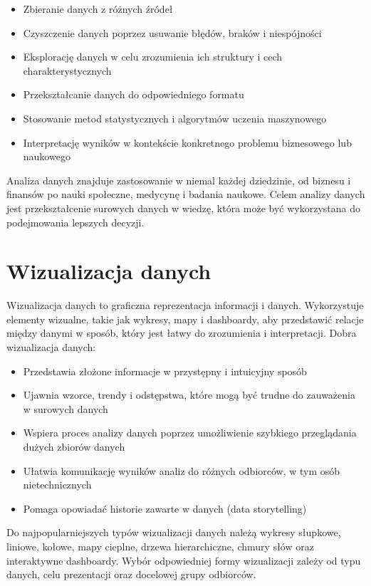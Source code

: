\documentclass[
  letterpaper,
  DIV=11,
  numbers=noendperiod]{scrreprt}
\providecommand{\tightlist}{%
  \setlength{\itemsep}{0pt}\setlength{\parskip}{0pt}}\usepackage{longtable,booktabs,array}
\begin{document}
\begin{itemize}
\tightlist
\item
  Zbieranie danych z różnych źródeł
\item
  Czyszczenie danych poprzez usuwanie błędów, braków i niespójności
\item
  Eksplorację danych w celu zrozumienia ich struktury i cech
  charakterystycznych
\item
  Przekształcanie danych do odpowiedniego formatu
\item
  Stosowanie metod statystycznych i algorytmów uczenia maszynowego
\item
  Interpretację wyników w kontekście konkretnego problemu biznesowego
  lub naukowego
\end{itemize}

Analiza danych znajduje zastosowanie w niemal każdej dziedzinie, od
biznesu i finansów po nauki społeczne, medycynę i badania naukowe. Celem
analizy danych jest przekształcenie surowych danych w wiedzę, która może
być wykorzystana do podejmowania lepszych decyzji.

\section{Wizualizacja danych}\label{wizualizacja-danych}

Wizualizacja danych to graficzna reprezentacja informacji i danych.
Wykorzystuje elementy wizualne, takie jak wykresy, mapy i dashboardy,
aby przedstawić relacje między danymi w sposób, który jest łatwy do
zrozumienia i interpretacji. Dobra wizualizacja danych:

\begin{itemize}
\tightlist
\item
  Przedstawia złożone informacje w przystępny i intuicyjny sposób
\item
  Ujawnia wzorce, trendy i odstępstwa, które mogą być trudne do
  zauważenia w surowych danych
\item
  Wspiera proces analizy danych poprzez umożliwienie szybkiego
  przeglądania dużych zbiorów danych
\item
  Ułatwia komunikację wyników analiz do różnych odbiorców, w tym osób
  nietechnicznych
\item
  Pomaga opowiadać historie zawarte w danych (data storytelling)
\end{itemize}

Do najpopularniejszych typów wizualizacji danych należą wykresy
słupkowe, liniowe, kołowe, mapy cieplne, drzewa hierarchiczne, chmury
słów oraz interaktywne dashboardy. Wybór odpowiedniej formy wizualizacji
zależy od typu danych, celu prezentacji oraz docelowej grupy odbiorców.
\end{document}
